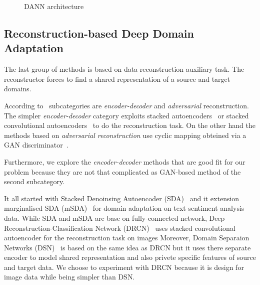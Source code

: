 \begin{figure}
\begin{center}
\end{center}
\caption{DANN architecture}
\end{figure}

\subsection{Reconstruction-based Deep Domain Adaptation}
\label{reconstruction_da}

The last group of methods is based on data reconstruction auxiliary task.
The reconstructor forces to find a shared representation
of a source and target domains.

According to~\cite{wang2018} subcategories are \textit{encoder-decoder} and
\textit{adversarial} reconstruction.
The simpler \textit{encoder-decoder} category exploits stacked autoencoders~\cite{vincent2008} or stacked convolutional autoencoders~\cite{masci2011}
to do the reconstruction task.
On the other hand the methods based on \textit{adversarial reconstruction}
use cyclic mapping obteined via a GAN discriminator~\cite{goodfellow2014}.

Furthermore, we explore the \textit{encoder-decoder} methods
that are good fit for our problem
because they are not that complicated
as GAN-based method of the second subcategory.

It all started with Stacked Denoinsing Autoencoder (SDA)~\cite{glorot2011}
and it extension marginalised SDA (mSDA)~\cite{chen2012}
for domain adaptation on text sentiment analysis data.
While SDA and mSDA are base on fully-connected network,
Deep Reconstruction-Classification Network (DRCN)~\cite{ghifary2016}
uses stacked convolutional autoencoder for the reconstruction task on images
Moreover, Domain Separaion Networks (DSN)~\cite{bousmalis2016} is based on the same idea as DRCN
but it uses there separate encoder to model shared representation and also privete specific features of source and target data.
We choose to experiment with DRCN
because it is design for image data while being simpler than DSN.

